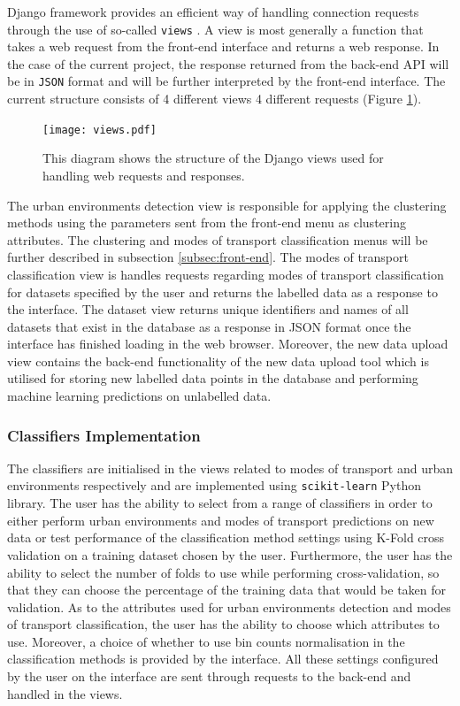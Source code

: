 \documentclass[bsc,frontabs,twoside,singlespacing, parskip,deptreport]{infthesis}     %
\begin{document}
Django framework provides an efficient way of handling connection requests through the use of so-called \texttt{views} \cite{django-views}. A view is most generally a function that takes a web request from the front-end interface and returns a web response. In the case of the current project, the response returned from the back-end API will be in \texttt{JSON} format \cite{json} and will be further interpreted by the front-end interface. The current structure consists of 4 different views 4 different requests (Figure \ref{fig:views}).

\begin{figure}[h!]
  \center
  \texttt{[image: views.pdf]}
  \caption{This diagram shows the structure of the Django views used for handling web requests and responses.}
  \label{fig:views}
\end{figure}

The urban environments detection view is responsible for applying the clustering methods using the parameters sent from the front-end menu as clustering attributes. The clustering and modes of transport classification menus will be further described in subsection \ref{subsec:front-end}. The modes of transport classification view is handles requests regarding modes of transport classification for datasets specified by the user and returns the labelled data as a response to the interface. The dataset view returns unique identifiers and names of all datasets that exist in the database as a response in JSON format once the interface has finished loading in the web browser. Moreover, the new data upload view contains the back-end functionality of the new data upload tool which is utilised for storing new labelled data points in the database and performing machine learning predictions on unlabelled data.


\subsubsection*{Classifiers Implementation}

The classifiers are initialised in the views related to modes of transport and urban environments respectively and are implemented using \texttt{scikit-learn} \cite{scikit-learn} Python library. The user has the ability to select from a range of classifiers in order to either perform urban environments and modes of transport predictions on new data or test performance of the classification method settings using K-Fold cross validation on a training dataset chosen by the user. Furthermore, the user has the ability to select the number of folds to use while performing cross-validation, so that they can choose the percentage of the training data that would be taken for validation. As to the attributes used for urban environments detection and modes of transport classification, the user has the ability to choose which attributes to use. Moreover, a choice of whether to use bin counts normalisation in the classification methods is provided by the interface. All these settings configured by the user on the interface are sent through requests to the back-end and handled in the views.
\end{document}
